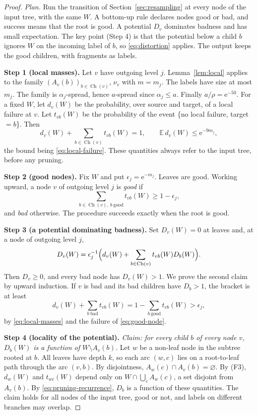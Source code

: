 \documentclass[11pt]{article}
\numberwithin{equation}{section}
\newcommand{\EE}{\mathbb E}
\newcommand{\ch}{\operatorname{Ch}}
\newcommand{\ee}{\mathrm e}
\newcommand{\Step}[1]{\par\smallskip\noindent\textbf{Step #1.}}
\begin{document}
\begin{proof}
\emph{Plan.} Run the transition of Section~\ref{sec:resampling} at every node of
the input tree, with the same $W$. A bottom-up rule declares nodes good or bad,
and success means that the root is good. A potential $D_v$ dominates badness and
has small expectation. The key point (Step 4) is that the potential below a
child $b$ ignores $W$ on the incoming label of $b$, so \eqref{eq:distortion}
applies. The output keeps the good children, with fragments as labels.

\Step{1 (local masses)} Let $v$ have outgoing level $j$.
Lemma~\ref{lem:local} applies to the family $(A_v(b))_{b\in\ch(v)}$,
$\nu_v$ with $m=m_j$. The labels have size at most $m_j$. The family is
$\alpha_j$-spread, hence $a$-spread since $\alpha_j\le a$. Finally
$a/\rho=\ee^{-50}$. For a fixed $W$, let $d_v(W)$ be the probability, over
source and target, of a local failure at $v$. Let $t_{vb}(W)$ be the
probability of the event \{no local failure, target $=b$\}. Then
\begin{equation}\label{eq:local-masses}
 d_v(W)+\sum_{b\in\ch(v)}t_{vb}(W)=1,\qquad \EE\, d_v(W)\le\ee^{-9m_j},
\end{equation}
the bound being \eqref{eq:local-failure}. These quantities always refer to the
input tree, before any pruning.

\Step{2 (good nodes)} Fix $W$ and put $\epsilon_j=\ee^{-m_j}$. Leaves are good.
Working upward, a node $v$ of outgoing level $j$ is \emph{good} if
\begin{equation}\label{eq:good-node}
 \sum_{b\in\ch(v),\ b\ \mathrm{good}}t_{vb}(W)\ge1-\epsilon_j,
\end{equation}
and \emph{bad} otherwise. The procedure succeeds exactly when the root is good.

\Step{3 (a potential dominating badness)} Set $D_v(W)=0$ at leaves and, at a
node of outgoing level $j$,
\begin{equation}\label{eq:pruning-recurrence}
 D_v(W)=\epsilon_j^{-1}\Bigl(d_v(W)+\sum_{b\in\ch(v)}t_{vb}(W)D_b(W)\Bigr).
\end{equation}
Then $D_v\ge0$, and every bad node has $D_v(W)>1$. We prove the second claim by
upward induction. If $v$ is bad and its bad children have $D_b>1$, the bracket
is at least
\[
 d_v(W)+\sum_{b\ \mathrm{bad}}t_{vb}(W)
 =1-\sum_{b\ \mathrm{good}}t_{vb}(W)>\epsilon_j ,
\]
by \eqref{eq:local-masses} and the failure of \eqref{eq:good-node}.

\Step{4 (locality of the potential)} \emph{Claim: for every child $b$ of every
node $v$, $D_b(W)$ is a function of $W\setminus A_v(b)$.} Let $w$ be a non-leaf
node in the subtree rooted at $b$. All leaves have depth $k$, so each arc
$(w,c)$ lies on a root-to-leaf path through the arc $(v,b)$. By disjointness,
$A_w(c)\cap A_v(b)=\varnothing$. By (F3), $d_w(W)$ and $t_{wc}(W)$ depend only
on $W\cap\bigcup_cA_w(c)$, a set disjoint from $A_v(b)$. By
\eqref{eq:pruning-recurrence}, $D_b$ is a function of these quantities. The
claim holds for all nodes of the input tree, good or not, and labels on
different branches may overlap.


\end{proof}
\end{document}
